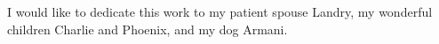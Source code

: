 
\vspace{3\worddouble}
{\centering
I would like to dedicate this work to my patient spouse Landry, my
wonderful children Charlie and Phoenix, and my dog Armani.\par}

